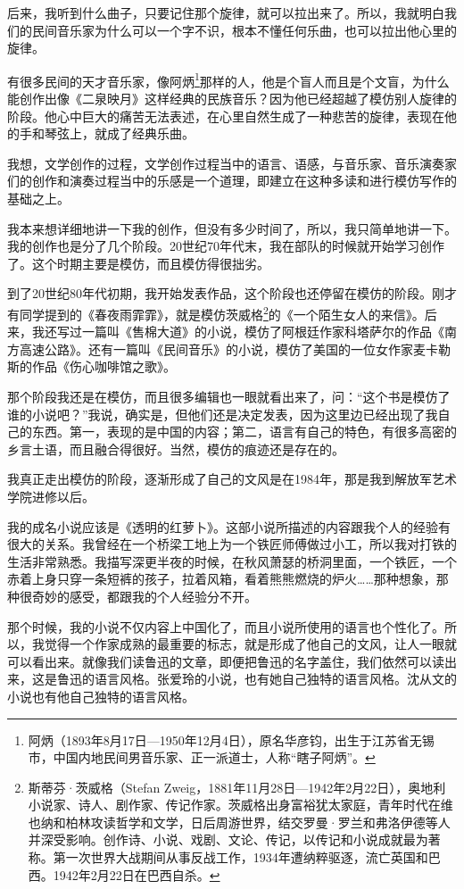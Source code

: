 \documentclass[fontset=fandol,12pt,a5paper]{ctexbook}
\begin{document}
后来，我听到什么曲子，只要记住那个旋律，就可以拉出来了。所以，我就明白我们的民间音乐家为什么可以一个字不识，根本不懂任何乐曲，也可以拉出他心里的旋律。

有很多民间的天才音乐家，像阿炳\footnote{阿炳（1893年8月17日—1950年12月4日），原名华彦钧，出生于江苏省无锡市，中国内地民间男音乐家、正一派道士，人称“瞎子阿炳”。}那样的人，他是个盲人而且是个文盲，为什么能创作出像《二泉映月》这样经典的民族音乐？因为他已经超越了模仿别人旋律的阶段。他心中巨大的痛苦无法表述，在心里自然生成了一种悲苦的旋律，表现在他的手和琴弦上，就成了经典乐曲。

我想，文学创作的过程，文学创作过程当中的语言、语感，与音乐家、音乐演奏家们的创作和演奏过程当中的乐感是一个道理，即建立在这种多读和进行模仿写作的基础之上。

我本来想详细地讲一下我的创作，但没有多少时间了，所以，我只简单地讲一下。我的创作也是分了几个阶段。20世纪70年代末，我在部队的时候就开始学习创作了。这个时期主要是模仿，而且模仿得很拙劣。

到了20世纪80年代初期，我开始发表作品，这个阶段也还停留在模仿的阶段。刚才有同学提到的《春夜雨霏霏》，就是模仿茨威格\footnote{斯蒂芬·茨威格（Stefan Zweig，1881年11月28日—1942年2月22日），奥地利小说家、诗人、剧作家、传记作家。茨威格出身富裕犹太家庭，青年时代在维也纳和柏林攻读哲学和文学，日后周游世界，结交罗曼·罗兰和弗洛伊德等人并深受影响。创作诗、小说、戏剧、文论、传记，以传记和小说成就最为著称。第一次世界大战期间从事反战工作，1934年遭纳粹驱逐，流亡英国和巴西。1942年2月22日在巴西自杀。}的《一个陌生女人的来信》。后来，我还写过一篇叫《售棉大道》的小说，模仿了阿根廷作家科塔萨尔的作品《南方高速公路》。还有一篇叫《民间音乐》的小说，模仿了美国的一位女作家麦卡勒斯的作品《伤心咖啡馆之歌》。

那个阶段我还是在模仿，而且很多编辑也一眼就看出来了，问：“这个书是模仿了谁的小说吧？”我说，确实是，但他们还是决定发表，因为这里边已经出现了我自己的东西。第一，表现的是中国的内容；第二，语言有自己的特色，有很多高密的乡言土语，而且融合得很好。当然，模仿的痕迹还是存在的。

我真正走出模仿的阶段，逐渐形成了自己的文风是在1984年，那是我到解放军艺术学院进修以后。

我的成名小说应该是《透明的红萝卜》。这部小说所描述的内容跟我个人的经验有很大的关系。我曾经在一个桥梁工地上为一个铁匠师傅做过小工，所以我对打铁的生活非常熟悉。我描写深更半夜的时候，在秋风萧瑟的桥洞里面，一个铁匠，一个赤着上身只穿一条短裤的孩子，拉着风箱，看着熊熊燃烧的炉火……那种想象，那种很奇妙的感受，都跟我的个人经验分不开。


那个时候，我的小说不仅内容上中国化了，而且小说所使用的语言也个性化了。所以，我觉得一个作家成熟的最重要的标志，就是形成了他自己的文风，让人一眼就可以看出来。就像我们读鲁迅的文章，即便把鲁迅的名字盖住，我们依然可以读出来，这是鲁迅的语言风格。张爱玲的小说，也有她自己独特的语言风格。沈从文的小说也有他自己独特的语言风格。
\end{document}
